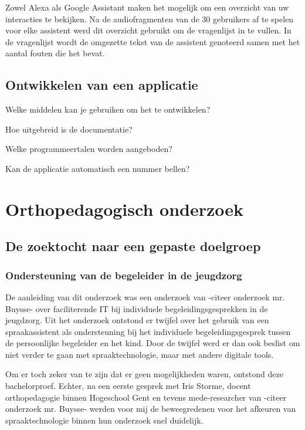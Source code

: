 Zowel Alexa als Google Assistant maken het mogelijk om een overzicht van uw interacties te bekijken. Na de audiofragmenten van de 30 gebruikers af te spelen voor elke assistent werd dit overzicht gebruikt om de vragenlijst in te vullen. In de vragenlijst wordt de omgezette tekst van de assistent genoteerd samen met het aantal fouten die het bevat.

\subsection{Ontwikkelen van een applicatie}
\label{sec:ontwikkelen van een applicatie}
Welke middelen kan je gebruiken om het te ontwikkelen?

Hoe uitgebreid is de documentatie?

Welke programmeertalen worden aangeboden?

Kan de applicatie automatisch een nummer bellen?

\section{Orthopedagogisch onderzoek}
\label{Orthopedagogisch onderzoek}
\subsection{De zoektocht naar een gepaste doelgroep}
\label{De zoektocht naar een gepaste doelgroep}

\subsubsection{Ondersteuning van de begeleider in de jeugdzorg}
\label{ondersteuning van de begeleider in de jeugdzorg}
De aanleiding van dit onderzoek was een onderzoek van -citeer onderzoek mr. Buysse- over faciliterende IT bij individuele begeleidingsgesprekken in de jeugdzorg. Uit het onderzoek ontstond er twijfel over het gebruik van een spraakassistent als ondersteuning bij het individuele begeleidingsgesprek tussen de persoonlijke begeleider en het kind. Door de twijfel werd er dan ook beslist om niet verder te gaan met spraaktechnologie, maar met andere digitale tools.

Om er toch zeker van te zijn dat er geen mogelijkheden waren, ontstond deze bachelorproef. Echter, na een eerste gesprek met Iris Storme, docent orthopedagogie binnen Hogeschool Gent en tevens mede-researcher van -citeer onderzoek mr. Buysse- werden voor mij de beweegredenen voor het afkeuren van spraaktechnologie binnen hun onderzoek snel duidelijk. 

